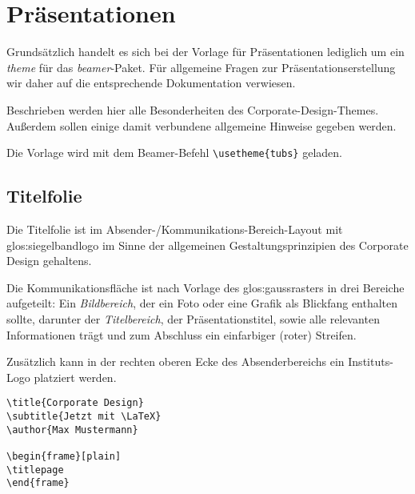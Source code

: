 \chapter{Präsentationen}


Grundsätzlich handelt es sich bei der Vorlage für Präsentationen lediglich um
ein \emph{theme} für das \emph{beamer}-Paket.
Für allgemeine Fragen zur Präsentationserstellung wir daher auf die
entsprechende Dokumentation\cite{beamer} verwiesen.

Beschrieben werden hier alle Besonderheiten des Corporate-Design-Themes.
Außerdem sollen einige damit verbundene allgemeine Hinweise gegeben werden.

Die Vorlage wird mit dem Beamer-Befehl \lstinline!\usetheme{tubs}! geladen.

\section{Titelfolie}\label{sec:titelfolie}

Die Titelfolie ist im Absender-/Kommunikations-Bereich-Layout mit
\gls{glos:siegelbandlogo} im Sinne der allgemeinen Gestaltungsprinzipien des
Corporate Design gehaltens.

Die Kommunikationsfläche ist nach Vorlage des \gls{glos:gaussraster}s
in drei Bereiche aufgeteilt:
Ein \emph{Bildbereich}, der ein Foto oder eine Grafik als Blickfang enthalten
sollte, darunter der \emph{Titelbereich}, der Präsentationstitel,
sowie alle relevanten Informationen trägt
und zum Abschluss ein einfarbiger (roter) Streifen.

Zusätzlich kann in der rechten oberen Ecke des Absenderbereichs ein
Instituts-Logo platziert werden.

\begin{minipage}{0.5\textwidth}
\begin{verbatim}
\title{Corporate Design}
\subtitle{Jetzt mit \LaTeX}
\author{Max Mustermann}

\begin{frame}[plain]
\titlepage
\end{frame}
\end{verbatim}
\end{minipage}
\begin{minipage}{0.5\textwidth}
\end{minipage}

